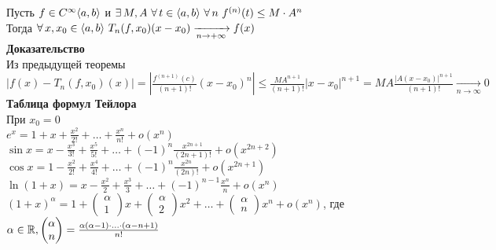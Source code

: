 \documentclass[12pt]{article}
\begin{document}
Пусть $f \in C^\infty \langle a,b \rangle$ и $\exists\,M, A\ \forall\,t \in \lan a,b\ran\ \forall\,n\ f^{(n)}(t) \leq M\cdot A^n$\\
Тогда $\forall\,x, x_0 \in \lan a, b \ran\ T_n(f, x_0)(x-x_0) \xrightarrow[n \rightarrow +\infty]{} f(x)$\\
\textbf{Доказательство}\\
Из предыдущей теоремы $|f(x) - T_n(f, x_0)(x)| = |\frac{f^{(n+1)}(c)}{(n+1)!}(x-x_0)^n| \leq \frac{MA^{n+1}}{(n+1)!}|x-x_0|^{n+1} = MA\frac{|A(x-x_0)|^{n+1}}{(n+1)!} \xrightarrow[n\rightarrow \infty]{} 0$\\
\textbf{Таблица формул Тейлора}\\
При $x_0 = 0$\\
$e^x = 1+x+\frac{x^2}{2!}+\ldots + \frac{x^n}{n!} + o(x^n)$\\
$\sin x = x - \frac{x^3}{3!} + \frac{x^5}{5!} + \ldots + (-1)^n\frac{x^{2n+1}}{(2n+1)!} + o(x^{2n+2})$\\
$\cos x = 1 - \frac{x^2}{2!} + \frac{x^4}{4!} + \ldots + (-1)^n\frac{x^{2n}}{(2n)!} + o(x^{2n+1})$\\
$\ln(1+x) = x - \frac{x^2}{2} + \frac{x^3}{3} + \ldots + (-1)^{n-1}\frac{x^n}{n}+o(x^n)$\\
$(1+x)^\alpha = 1+\begin{pmatrix}\alpha\\1\end{pmatrix}x+\begin{pmatrix}\alpha\\2\end{pmatrix}x^2 + \ldots + \begin{pmatrix}\alpha\\n\end{pmatrix}x^n + o(x^n)$, где\\
$\alpha \in \mathbb{R}, \begin{pmatrix}\alpha\\n\end{pmatrix} = \frac{\alpha(\alpha-1)\cdot\ldots\cdot(\alpha-n+1)}{n!}$
\end{document}
